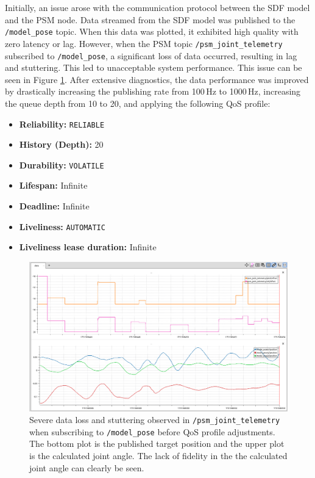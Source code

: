 Initially, an issue arose with the communication protocol between the SDF model and the PSM node. Data streamed from the SDF model was published to the \texttt{/model\_pose} topic. When this data was plotted, it exhibited high quality with zero latency or lag. However, when the PSM topic \texttt{/psm\_joint\_telemetry} subscribed to \texttt{/model\_pose}, a significant loss of data occurred, resulting in lag and stuttering. This led to unacceptable system performance. This issue can be seen in Figure \ref{fig:data_loss_before_qos}. After extensive diagnostics, the data performance was improved by drastically increasing the publishing rate from 100\,Hz to 1000\,Hz, increasing the queue depth from 10 to 20, and applying the following QoS profile:

\begin{itemize}
    \item \textbf{Reliability:} \texttt{RELIABLE}
    \item \textbf{History (Depth):} 20
    \item \textbf{Durability:} \texttt{VOLATILE}
    \item \textbf{Lifespan:} Infinite
    \item \textbf{Deadline:} Infinite
    \item \textbf{Liveliness:} \texttt{AUTOMATIC}
    \item \textbf{Liveliness lease duration:} Infinite
\end{itemize}

\begin{figure}[H]
    \centering
    \includegraphics[width=0.95\linewidth]{figures/bad_data.png}
    \caption{Severe data loss and stuttering observed in \texttt{/psm\_joint\_telemetry} when subscribing to \texttt{/model\_pose} before QoS profile adjustments. The bottom plot is the published target position and the upper plot is the calculated joint angle. The lack of fidelity in the the calculated joint angle can clearly be seen.}
    \label{fig:data_loss_before_qos}
\end{figure}

